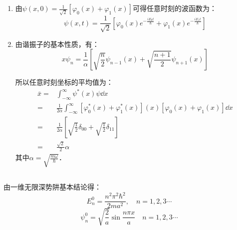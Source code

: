 \subsection{ }
\begin{enumerate}
\item 由$\displaystyle \psi (x,0) = \frac{1}{\sqrt{2}}[\varphi_{0}(x) + \varphi_{1}(x)] $可得任意时刻的波函数为：\\
\begin{equation}
\psi(x,t) = \frac{1}{\sqrt{2}}\left[\varphi_{0}(x)e^{-\frac{iE_{0}t}{\hbar}} + \varphi_{1}(x)e^{-\frac{iE_{1}t}{\hbar}} \right]
\end{equation}

\item 由谐振子的基本性质，有：\\
\begin{equation}
x\psi_{n} = \frac{1}{\alpha} \left[\sqrt{\frac{n}{2}}\psi_{n-1}(x) + \sqrt{\frac{n+1}{2}}\psi_{n+1}(x) \right]
\end{equation}

所以任意时刻坐标的平均值为：\\
\begin{equation}
\begin{aligned}
\bar{x} =& \int^{\infty}_{-\infty} \psi^{*}(x)\psi \dd{x} \\
=& \frac{1}{2\alpha} \int^{\infty}_{-\infty} \left[\varphi^{*}_{0}(x)+\varphi^{*}_{1}(x)\right](x)\left[\varphi_{0}(x)+\varphi_{1}(x)\right] \dd{x} \\
=& \frac{1}{2\alpha} \left[\sqrt{\frac{1}{2}}\delta_{00}+\sqrt{\frac{1}{2}}\delta_{11} \right] \\
=& \frac{\sqrt{2}}{2} \alpha
\end{aligned}
\end{equation}
其中$\displaystyle \alpha = \sqrt{\frac{m\omega}{\hbar}} $．
\end{enumerate}
\subsection{ }
由一维无限深势阱基本结论得：\\
\begin{equation}
E^{0}_{n} = \frac{n^{2} \pi^{2} \hbar^{2}}{2ma^{2}},\quad n = 1,2,3\cdots
\end{equation}
\begin{equation}
\psi^{0}_{n} = \sqrt{\frac{2}{a}} \sin{\frac{n \pi x}{a}}\quad n = 1,2,3\cdots
\end{equation}

